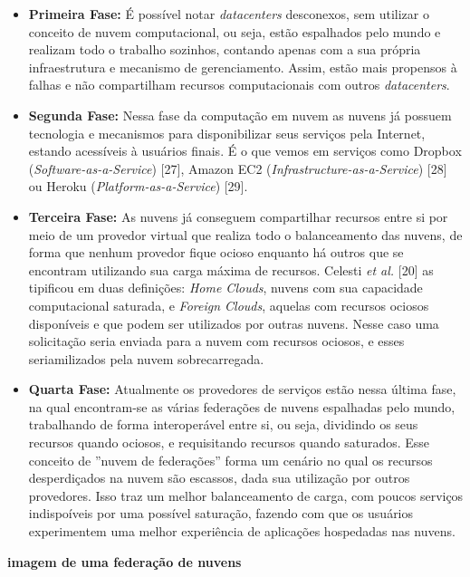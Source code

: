 \begin{itemize}
	\item \textbf{Primeira Fase:} É possível notar \textit{datacenters} desconexos, sem utilizar o conceito de nuvem computacional, ou seja, estão espalhados pelo mundo e realizam todo o trabalho sozinhos, contando apenas com a sua própria infraestrutura e mecanismo de gerenciamento. Assim, estão mais propensos à falhas e não compartilham recursos computacionais com outros \textit{datacenters}.
    \item \textbf{Segunda Fase:} Nessa fase da computação em nuvem as nuvens já possuem tecnologia e mecanismos para disponibilizar seus serviços pela Internet, estando acessíveis à usuários finais. É o que vemos em serviços como Dropbox (\textit{Software-as-a-Service}) [27], Amazon EC2 (\textit{Infrastructure-as-a-Service}) [28] ou Heroku (\textit{Platform-as-a-Service}) [29].
    \item \textbf{Terceira Fase:} As nuvens já conseguem compartilhar recursos entre si por meio de um provedor virtual que realiza todo o balanceamento das nuvens, de forma que nenhum provedor fique ocioso enquanto há outros que se encontram utilizando sua carga máxima de recursos. Celesti \textit{et al.} [20] as tipificou em duas definições: \textit{Home Clouds}, nuvens com sua capacidade computacional saturada, e \textit{Foreign Clouds}, aquelas com recursos ociosos disponíveis e que podem ser utilizados por outras nuvens. Nesse caso uma solicitação seria enviada para a nuvem com recursos ociosos, e esses seriamilizados pela nuvem sobrecarregada. 
    \item \textbf{Quarta Fase:} Atualmente os provedores de serviços estão nessa última fase, na qual encontram-se as várias federações de nuvens espalhadas pelo mundo, trabalhando de forma interoperável entre si, ou seja, dividindo os seus recursos quando ociosos, e requisitando recursos quando saturados. Esse conceito de ''nuvem de federações'' forma um cenário no qual os recursos desperdiçados na nuvem são escassos, dada sua utilização por outros provedores. Isso traz um melhor balanceamento de carga, com poucos serviços indispoíveis por uma possível saturação, fazendo com que os usuários experimentem uma melhor experiência de aplicações hospedadas nas nuvens. 
\end{itemize}

\begin{center}
	\textbf{\small{imagem de uma federação de nuvens}}
\end{center}

